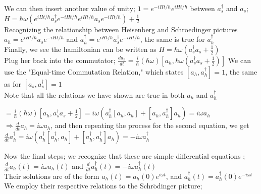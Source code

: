 \documentclass[12pt]{article}
\begin{document}
We can then insert another value of unity; $1=e^{-iHt/\hbar}e^{iHt/\hbar}$ between $a^\dagger_s$ and $ a_s$;\\

$H=\hbar\omega(e^{iHt/\hbar}a^\dagger_s e^{-iHt/\hbar} e^{iHt/\hbar} a_se^{-iHt/\hbar})+\frac{1}{2}$\\

Recognizing the relationship between Heisenberg and Schroedinger pictures\\

$a_h=e^{iHt/\hbar}a_se^{-iHt/\hbar}$ and $a^\dagger_h=e^{iHt/\hbar}a^\dagger_s e^{-iHt/\hbar}$, the same is true for $a^\dagger_h$\\

Finally, we see the hamiltonian can be written as $H=\hbar\omega(a_s^\dagger a_s+\frac{1}{2})$\\

Plug her back into the commutator; $\frac{da_h}{dt}=\frac{i}{\hbar}(\hbar\omega)[a_h,\hbar\omega(a^\dagger_s a_s +\frac{1}{2})]$ We can use the "Equal-time Commutation Relation," which states $[a_h,a^\dagger_h]=1$, the same as for $[a_s,a^\dagger_s]=1$\\

Note that all the relations we have shown are true in both $a_h$ and $a^\dagger_h$

$=\frac{i}{\hbar}(\hbar\omega)[a_h,a^\dagger_s a_s +\frac{1}{2}]=i\omega(a^\dagger_h[a_h,a_h]+[a_h,a^\dagger_h]a_h)=i\omega a_h$\\

$\Rightarrow \frac{d}{dt}a_h=i\omega a_h$, and then repeating the process for the second equation, we get\\ $\frac{d}{dt}a^\dagger_h=i\omega(a^\dagger_h[a^\dagger_h,a_h]+[a^\dagger_h,a^\dagger_h]a_h)=-i\omega a^\dagger_h$\\
\pagebreak

Now the final steps; we recognize that these are simple differential equations ;\\

$\frac{d}{dt}a_h(t)=i\omega a_h(t)$ and $\frac{d}{dt}a^\dagger_h(t)=-i\omega a^\dagger_h(t)$\\

Their solutions are of the form $a_h(t)=a_h(0)e^{i\omega t}$, and $a^\dagger_h(t)=a^\dagger_h(0)e^{-i\omega t}$\\

We employ their respective relations to the Schr$\ddot{\text{o}}$dinger picture;\\
\end{document}
